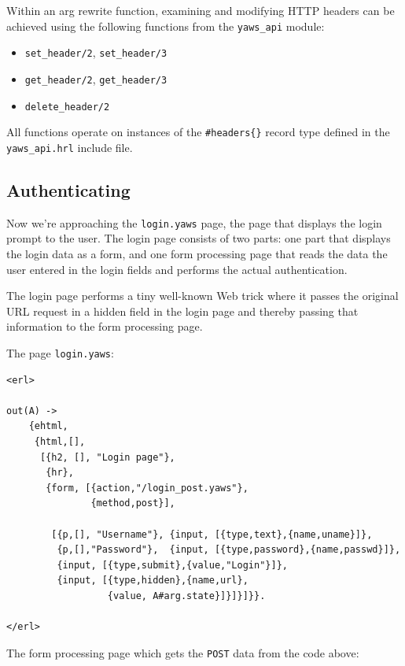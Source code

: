 \documentclass[11pt,oneside,english]{book}
\begin{document}
Within an arg rewrite function, examining and modifying HTTP headers can be
achieved using the following functions from the \verb+yaws_api+ module:

\begin{itemize}
\item \verb+set_header/2+, \verb+set_header/3+
\item \verb+get_header/2+, \verb+get_header/3+
\item \verb+delete_header/2+
\end{itemize}

All functions operate on instances of the \verb+#headers{}+ record type
defined in the \verb+yaws_api.hrl+ include file.

\subsection{Authenticating}

Now we're approaching the \verb+login.yaws+ page, the page that
displays the login prompt to the user. The login page consists of two
parts: one part that displays the login data as a form, and one form
processing page that reads the data the user entered in the login
fields and performs the actual authentication.

The login page performs a tiny well-known Web trick where it passes
the original URL request in a hidden field in the login page and
thereby passing that information to the form processing page.

The page \verb+login.yaws+:

\begin{verbatim}
<erl>

out(A) ->
    {ehtml,
     {html,[],
      [{h2, [], "Login page"},
       {hr},
       {form, [{action,"/login_post.yaws"},
               {method,post}],

        [{p,[], "Username"}, {input, [{type,text},{name,uname}]},
         {p,[],"Password"},  {input, [{type,password},{name,passwd}]},
         {input, [{type,submit},{value,"Login"}]},
         {input, [{type,hidden},{name,url},
                  {value, A#arg.state}]}]}]}}.

</erl>
\end{verbatim}



The form processing page which gets the \verb+POST+ data from the code
above:
\end{document}
